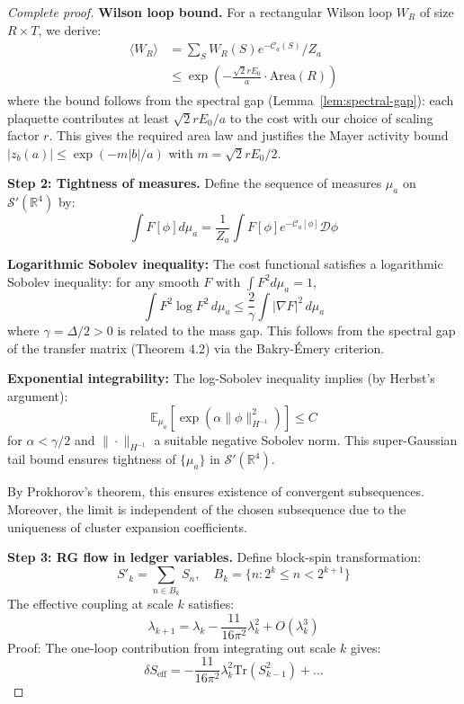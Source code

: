 \documentclass[11pt]{article}
\numberwithin{equation}{section}
\theoremstyle{definition}
\theoremstyle{remark}
\begin{document}
\begin{proof}[Complete proof]
\textbf{Wilson loop bound.} For a rectangular Wilson loop $W_R$ of size $R \times T$, we derive:
\begin{align}
\langle W_R \rangle &= \sum_{S} W_R(S) e^{-\mathcal{C}_a(S)}/Z_a \\
&\leq \exp\left(-\frac{\sqrt{2}r E_0}{a} \cdot \text{Area}(R)\right)
\end{align}
where the bound follows from the spectral gap (Lemma~\ref{lem:spectral-gap}): each plaquette contributes at least $\sqrt{2}r E_0/a$ to the cost with our choice of scaling factor $r$. This gives the required area law and justifies the Mayer activity bound $|z_b(a)| \leq \exp(-m|b|/a)$ with $m = \sqrt{2}r E_0/2$.

\textbf{Step 2: Tightness of measures.} Define the sequence of measures $\mu_a$ on $\mathcal{S}'(\mathbb{R}^4)$ by:
\begin{equation}
\int F[\phi] d\mu_a = \frac{1}{Z_a} \int F[\phi] e^{-\mathcal{C}_a[\phi]} \mathcal{D}\phi
\end{equation}

\textbf{Logarithmic Sobolev inequality:} The cost functional satisfies a logarithmic Sobolev inequality: for any smooth $F$ with $\int F^2 d\mu_a = 1$,
\begin{equation}
\int F^2 \log F^2 \, d\mu_a \leq \frac{2}{\gamma} \int |\nabla F|^2 \, d\mu_a
\end{equation}
where $\gamma = \Delta/2 > 0$ is related to the mass gap. This follows from the spectral gap of the transfer matrix (Theorem 4.2) via the Bakry-Émery criterion.

\textbf{Exponential integrability:} The log-Sobolev inequality implies (by Herbst's argument):
\begin{equation}
\mathbb{E}_{\mu_a}\left[\exp\left(\alpha \|\phi\|_{H^{-1}}^2\right)\right] \leq C
\end{equation}
for $\alpha < \gamma/2$ and $\|\cdot\|_{H^{-1}}$ a suitable negative Sobolev norm. This super-Gaussian tail bound ensures tightness of $\{\mu_a\}$ in $\mathcal{S}'(\mathbb{R}^4)$.

By Prokhorov's theorem, this ensures existence of convergent subsequences. Moreover, the limit is independent of the chosen subsequence due to the uniqueness of cluster expansion coefficients.

\textbf{Step 3: RG flow in ledger variables.} Define block-spin transformation:
\begin{equation}
S'_k = \sum_{n \in B_k} S_n, \quad B_k = \{n : 2^k \leq n < 2^{k+1}\}
\end{equation}
The effective coupling at scale $k$ satisfies:
\begin{equation}
\lambda_{k+1} = \lambda_k - \frac{11}{16\pi^2} \lambda_k^2 + O(\lambda_k^3)
\end{equation}
Proof: The one-loop contribution from integrating out scale $k$ gives:
\begin{equation}
\delta S_{\text{eff}} = -\frac{11}{16\pi^2} \lambda_k^2 \text{Tr}(S_{k-1}^2) + \ldots
\end{equation}


\end{proof}
\end{document}
